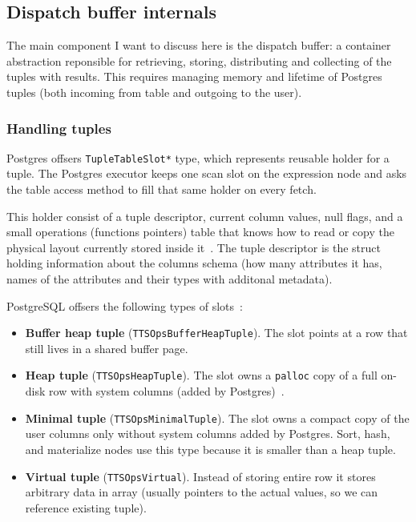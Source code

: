 \subsection{Dispatch buffer internals}
\label{sec:dispatch-buffer-api}

The main component I want to discuss here is the dispatch buffer: a container abstraction reponsible for retrieving, storing, distributing and collecting of the tuples with results.
This requires managing memory and lifetime of Postgres tuples (both incoming from table and outgoing to the user).

\subsubsection{Handling tuples}

Postgres offsers \texttt{TupleTableSlot*} type, which represents reusable holder for a tuple.
The Postgres executor keeps one scan slot on the expression node and asks the table access method to fill that same holder on every fetch.

This holder consist of a tuple descriptor, current column values, null flags, and a small operations (functions pointers) table that knows how to read or copy the physical layout currently stored inside it~\parencite{postgresql17_tuptable}.
The tuple descriptor is the struct holding information about the columns schema (how many attributes it has, names of the attributes and their types with additonal metadata).

PostgreSQL offsers the following types of slots~:
\begin{itemize}
  \item \textbf{Buffer heap tuple} (\texttt{TTSOpsBufferHeapTuple}).
        The slot points at a row that still lives in a shared buffer page.
  \item \textbf{Heap tuple} (\texttt{TTSOpsHeapTuple}).
        The slot owns a \texttt{palloc} copy of a full on-disk row with system columns (added by Postgres)~\parencite{postgresql17_storage_page_layout}.
  \item \textbf{Minimal tuple} (\texttt{TTSOpsMinimalTuple}).
        The slot owns a compact copy of the user columns only without system columns added by Postgres.
        Sort, hash, and materialize nodes use this type because it is smaller than a heap tuple.
  \item \textbf{Virtual tuple} (\texttt{TTSOpsVirtual}).
        Instead of storing entire row it stores arbitrary data in array (usually pointers to the actual values, so we can reference existing tuple).
\end{itemize}

